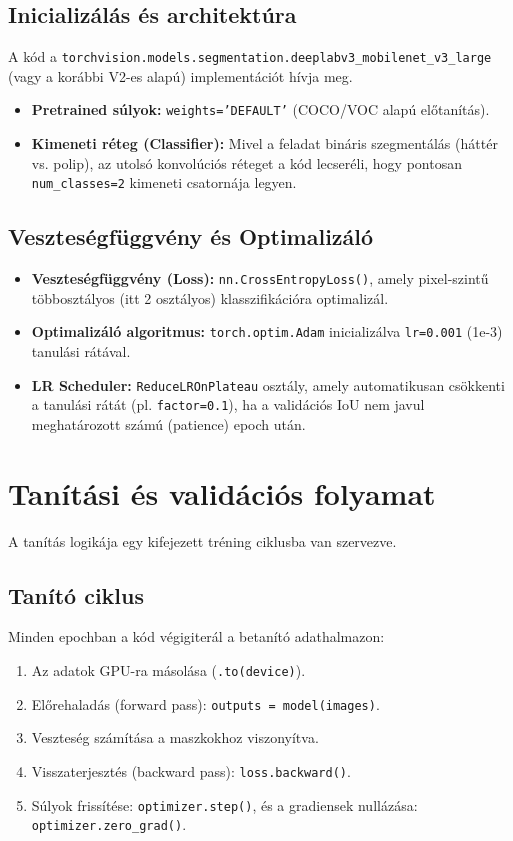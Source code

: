 \documentclass[12pt, a4paper]{report}
\begin{document}
\subsection{Inicializálás és architektúra}
A kód a \texttt{torchvision.models.segmentation.deeplabv3\_mobilenet\_v3\_large} (vagy a korábbi V2-es alapú) implementációt hívja meg.
\begin{itemize}
    \item \textbf{Pretrained súlyok:} \texttt{weights='DEFAULT'} (COCO/VOC alapú előtanítás).
    \item \textbf{Kimeneti réteg (Classifier):} Mivel a feladat bináris szegmentálás (háttér vs. polip), az utolsó konvolúciós réteget a kód lecseréli, hogy pontosan \texttt{num\_classes=2} kimeneti csatornája legyen.
\end{itemize}

\subsection{Veszteségfüggvény és Optimalizáló}
\begin{itemize}
    \item \textbf{Veszteségfüggvény (Loss):} \texttt{nn.CrossEntropyLoss()}, amely pixel-szintű többosztályos (itt 2 osztályos) klasszifikációra optimalizál.
    \item \textbf{Optimalizáló algoritmus:} \texttt{torch.optim.Adam} inicializálva \texttt{lr=0.001} (1e-3) tanulási rátával.
    \item \textbf{LR Scheduler:} \texttt{ReduceLROnPlateau} osztály, amely automatikusan csökkenti a tanulási rátát (pl. \texttt{factor=0.1}), ha a validációs IoU nem javul meghatározott számú (patience) epoch után.
\end{itemize}

\section{Tanítási és validációs folyamat}

A tanítás logikája egy kifejezett tréning ciklusba van szervezve.

\subsection{Tanító ciklus}
Minden epochban a kód végigiterál a betanító adathalmazon:
\begin{enumerate}
    \item Az adatok GPU-ra másolása (\texttt{.to(device)}).
    \item Előrehaladás (forward pass): \texttt{outputs = model(images)}.
    \item Veszteség számítása a maszkokhoz viszonyítva.
    \item Visszaterjesztés (backward pass): \texttt{loss.backward()}.
    \item Súlyok frissítése: \texttt{optimizer.step()}, és a gradiensek nullázása: \texttt{optimizer.zero\_grad()}.
\end{enumerate}
\end{document}
